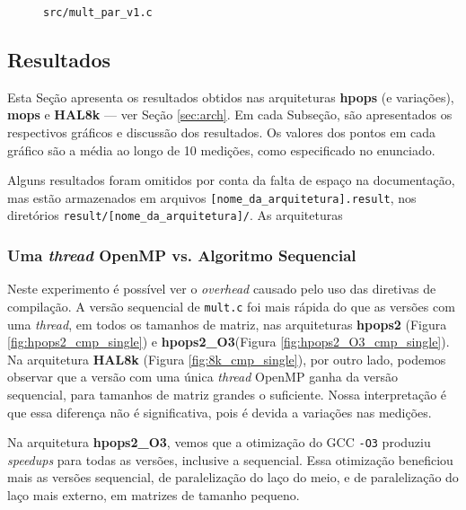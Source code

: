 \documentclass[a4paper, 12pt]{article}
\begin{document}
\begin{figure}[H]
    \centering
    
    \caption{\texttt{src/mult\_par\_v1.c}}
    \label{fig:par_v1}
\end{figure}

\subsection{Resultados} \label{sec:res}

Esta Seção apresenta os resultados obtidos nas arquiteturas \textbf{hpops}
(e variações), \textbf{mops} e \textbf{HAL8k} --- ver Seção \ref{sec:arch}.
Em cada Subseção, são apresentados os respectivos gráficos e discussão dos
resultados. Os valores dos pontos em cada gráfico são a média ao longo de
10 medições, como especificado no enunciado.

Alguns resultados foram omitidos por conta da falta de espaço na
documentação, mas estão armazenados em arquivos
\texttt{[nome\_da\_arquitetura].result}, nos diretórios
\texttt{result/[nome\_da\_arquitetura]/}. As arquiteturas

\subsubsection{Uma \textit{thread} OpenMP vs. Algoritmo Sequencial}

Neste experimento é possível ver o \textit{overhead} causado pelo uso das
diretivas de compilação. A versão sequencial de \texttt{mult.c} foi mais rápida
do que as versões com uma \textit{thread}, em todos os tamanhos de matriz, nas
arquiteturas \textbf{hpops2} (Figura \ref{fig:hpops2_cmp_single}) e
\textbf{hpops2\_O3}(Figura \ref{fig:hpops2_O3_cmp_single}). Na arquitetura
\textbf{HAL8k} (Figura \ref{fig:8k_cmp_single}), por outro lado, podemos
observar que a versão com uma única \textit{thread} OpenMP ganha da
versão sequencial, para tamanhos de matriz grandes o suficiente. Nossa
interpretação é que essa diferença não é significativa, pois é devida a
variações nas medições.

Na arquitetura \textbf{hpops2\_O3}, vemos que a otimização do GCC \texttt{-O3}
produziu \textit{speedups} para todas as versões, inclusive a sequencial.
Essa otimização beneficiou mais as versões sequencial, de paralelização do
laço do meio, e de paralelização do laço mais externo, em matrizes de tamanho
pequeno.
\end{document}
